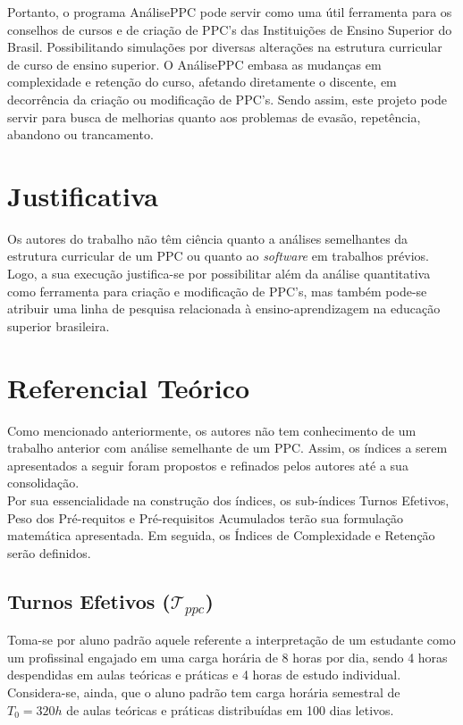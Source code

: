 \documentclass[a4paper, 12pt]{article}
\begin{document}
Portanto, o programa AnálisePPC pode servir como uma útil ferramenta para os conselhos de cursos e de criação de PPC's das Instituições de Ensino Superior 
do Brasil. Possibilitando simulações por diversas alterações na estrutura curricular de curso de ensino superior. O AnálisePPC embasa as mudanças em complexidade e 
retenção do curso, afetando diretamente o discente, em decorrência da criação ou modificação de PPC's. Sendo assim, este projeto pode servir para 
busca de melhorias quanto aos problemas de evasão, repetência, abandono ou trancamento.

\section*{Justificativa}

Os autores do trabalho não têm ciência quanto a análises semelhantes da estrutura curricular de um PPC ou quanto ao \textit{software} em trabalhos 
prévios. Logo, a sua execução justifica-se por possibilitar além da análise quantitativa como ferramenta para criação e modificação de PPC's, 
mas também pode-se atribuir uma linha de pesquisa relacionada à ensino-aprendizagem na educação superior brasileira.

\section*{Referencial Teórico}
Como mencionado anteriormente, os autores não tem conhecimento de um trabalho anterior com análise semelhante de um PPC. Assim, os índices a serem apresentados 
a seguir foram propostos e refinados pelos autores até a sua consolidação. \\ 

Por sua essencialidade na construção dos índices, os sub-índices Turnos Efetivos, Peso dos Pré-requitos e Pré-requisitos Acumulados terão sua formulação 
matemática apresentada. Em seguida, os Índices de Complexidade e Retenção serão definidos.

\subsection*{Turnos Efetivos ($\mathcal{T}_{ppc}$)}
Toma-se por aluno padrão aquele referente a interpretação de um estudante como um profissinal engajado em uma carga horária de 8 horas por dia, sendo 
4 horas despendidas em aulas teóricas e práticas e 4 horas de estudo individual. Considera-se, ainda, que o aluno padrão tem carga horária semestral de 
$T_0 = 320h$ de aulas teóricas e práticas distribuídas em 100 dias letivos. \\ 
\end{document}
